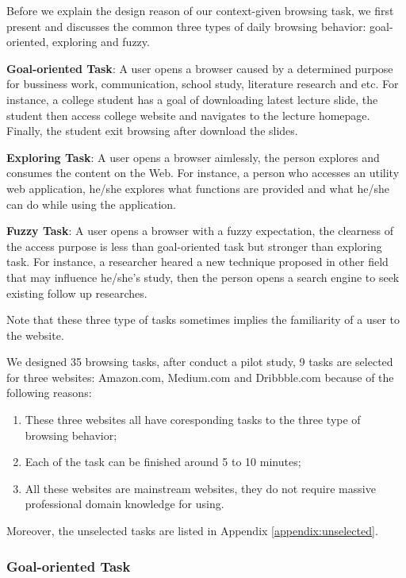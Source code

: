 Before we explain the design reason of our context-given browsing task, we first present
and discusses the common three types of daily browsing behavior: goal-oriented, exploring and fuzzy. 

\textbf{Goal-oriented Task}: A user opens a browser caused by a determined purpose for bussiness work, communication,
school study, literature research and etc.
For instance, a college student has a goal of downloading latest lecture slide, the student then
access college website and navigates to the lecture homepage. Finally, the student exit 
browsing after download the slides.

\textbf{Exploring Task}: A user opens a browser aimlessly, the person explores and consumes the content
on the Web. For instance, a person who accesses an utility web application, he/she explores
what functions are provided and what he/she can do while using the application.

\textbf{Fuzzy Task}: A user opens a browser with a fuzzy expectation, the clearness of the access purpose
is less than goal-oriented task but stronger than exploring task.
For instance, a researcher heared a new technique proposed in other field that may influence he/she's study, 
then the person opens a search engine to seek existing follow up researches.

Note that these three type of tasks sometimes implies the familiarity of a user to the website.

We designed 35 browsing tasks, after conduct a pilot study, 
9 tasks are selected for three websites: Amazon.com, Medium.com and Dribbble.com 
because of the following reasons:

\begin{enumerate}
    \item These three websites all have coresponding tasks to the three type of browsing behavior;
    \item Each of the task can be finished around 5 to 10 minutes;
    \item All these websites are mainstream websites, they do not require 
        massive professional domain knowledge for using.
\end{enumerate}

Moreover, the unselected tasks are listed in Appendix \ref{appendix:unselected}.

\subsubsection{Goal-oriented Task}

